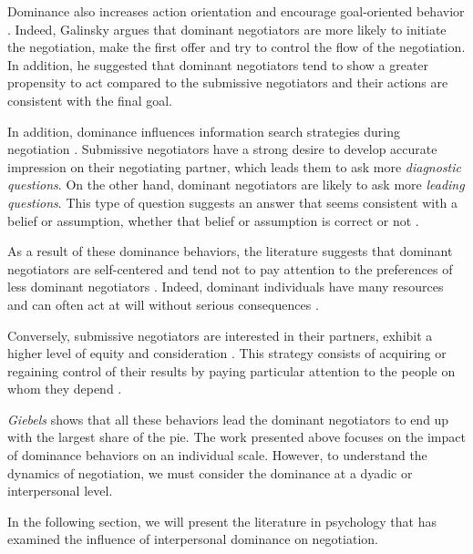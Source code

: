 \documentclass{llncs}
\begin{document}
	Dominance also increases action orientation and encourage goal-oriented behavior \cite{van2006power}. Indeed, Galinsky  \cite{Galinsky2003power} argues that dominant negotiators are more likely to initiate the negotiation, make the first offer and try to control the flow of the negotiation. 
	In addition, he suggested that dominant negotiators tend to show a greater propensity to act compared to the submissive negotiators and their actions are consistent with the final goal.
	
	In addition, dominance influences information search strategies during negotiation \cite{de2004influence}. Submissive negotiators have a strong desire to develop accurate impression on their negotiating partner, which leads them to ask more \emph{diagnostic questions}.
	On the other hand, dominant negotiators are likely to ask more \emph{leading questions}. This type of question suggests an answer that seems consistent with a belief or assumption, whether that belief or assumption is correct or not \cite{Galinsky2003power}.
	
	As a result of these dominance behaviors, the literature suggests that dominant negotiators are self-centered and tend not to pay attention to the preferences of less dominant negotiators \cite{fiske1993controlling,de1995impact}. Indeed, dominant individuals have many resources and can often act at will without serious consequences \cite{van2006power}. 
	
	Conversely, submissive negotiators are interested in their partners, exhibit a higher level of equity and consideration \cite{de1995impact}. This strategy consists of acquiring or regaining control of their results by paying particular attention to the people on whom they depend \cite{fiske1993controlling}.
	
	\emph{Giebels} \cite{giebels2000interdependence} shows that all these behaviors lead the dominant negotiators to end up with the largest share of the pie.
	The work presented above focuses on the impact of dominance behaviors on an individual scale. However, to understand the dynamics of negotiation, we must consider the dominance at a dyadic or interpersonal level. 
	
	In the following section, we will present the literature in psychology that has examined the influence of interpersonal dominance on negotiation. 
	
\end{document}
